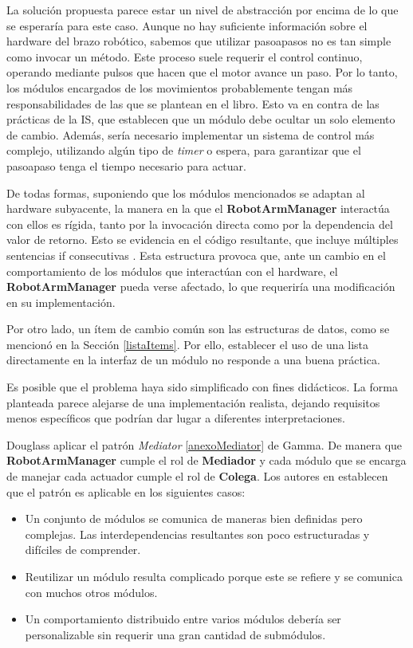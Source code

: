 La solución propuesta parece estar un nivel de abstracción por encima de lo que se esperaría para este caso. Aunque no hay suficiente información sobre el hardware del brazo robótico, sabemos que utilizar \glspl{pasoapaso} no es tan simple como invocar un método. Este proceso suele requerir el control continuo, operando mediante pulsos que hacen que el motor avance un paso. Por lo tanto, los módulos encargados de los movimientos probablemente tengan más responsabilidades de las que se plantean en el libro. Esto va en contra de las prácticas de la \gls{IS}, que establecen que un módulo debe ocultar un solo elemento de cambio. Además, sería necesario implementar un sistema de control más complejo, utilizando algún tipo de \textit{timer} o espera, para garantizar que el \gls{pasoapaso} tenga el tiempo necesario para actuar.

De todas formas, suponiendo que los módulos mencionados se adaptan al hardware subyacente, la manera en la que el \textbf{RobotArmManager} interactúa con ellos es rígida, tanto por la invocación directa como por la dependencia del valor de retorno. Esto se evidencia en el código resultante, que incluye múltiples sentencias if consecutivas \cite[Pág. 107]{douglass}. Esta estructura provoca que, ante un cambio en el comportamiento de los módulos que interactúan con el hardware, el \textbf{RobotArmManager} pueda verse afectado, lo que requeriría una modificación en su implementación.

Por otro lado, un ítem de cambio común son las estructuras de datos, como se mencionó en la Sección \ref{listaItems}. Por ello, establecer el uso de una lista directamente en la interfaz de un módulo no responde a una buena práctica.

Es posible que el problema haya sido simplificado con fines didácticos. La forma planteada parece alejarse de una implementación realista, dejando requisitos menos específicos que podrían dar lugar a diferentes interpretaciones.

Douglass aplicar el patrón \textit{Mediator} \ref{anexoMediator} de Gamma. De manera que \textbf{RobotArmManager} cumple el rol de \textbf{Mediador} y cada módulo que se encarga de manejar cada actuador cumple el rol de \textbf{Colega}. Los autores en \cite{Gamma:1995:DPE:186897} establecen que el patrón es aplicable en los siguientes casos:
\begin{itemize}
\item Un conjunto de módulos se comunica de maneras bien definidas pero complejas. Las interdependencias resultantes son poco estructuradas y difíciles de comprender.

\item Reutilizar un módulo resulta complicado porque este se refiere y se comunica con muchos otros módulos.

\item Un comportamiento distribuido entre varios módulos debería ser personalizable sin requerir una gran cantidad de submódulos.
\end{itemize}

